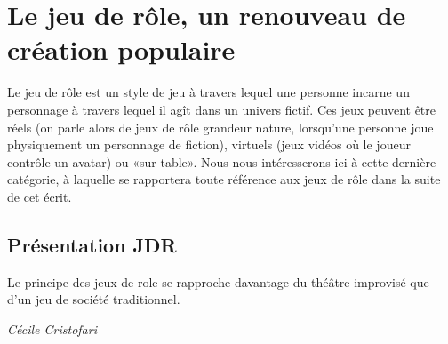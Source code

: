 \section{Le jeu de rôle, un renouveau de création populaire}

Le jeu de rôle est un style de jeu à travers lequel une personne incarne un personnage à travers lequel il agît dans un univers fictif. Ces jeux peuvent être réels (on parle alors de jeux de rôle grandeur nature, lorsqu'une personne joue physiquement un personnage de fiction), virtuels (jeux vidéos où le joueur contrôle un avatar) ou «sur table». Nous nous intéresserons ici à cette dernière catégorie, à laquelle se rapportera toute référence aux jeux de rôle dans la suite de cet écrit.

\subsection{Présentation JDR}

\begin{shadequote}
Le principe des jeux de role se rapproche davantage du théâtre improvisé que d'un jeu de société traditionnel. \par\emph{C{\'e}cile Cristofari \cite{cristofari2010lecteur}}
\end{shadequote}



